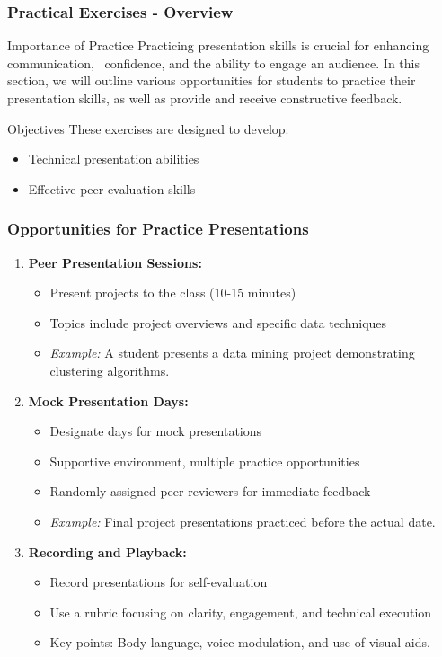 \documentclass[aspectratio=169]{beamer}
\begin{document}
\begin{frame}[fragile]
    \frametitle{Practical Exercises - Overview}
    \begin{block}{Importance of Practice}
        Practicing presentation skills is crucial for enhancing communication, \
        confidence, and the ability to engage an audience. In this section, we will outline various opportunities for students to practice their presentation skills, as well as provide and receive constructive feedback.
    \end{block}
    \begin{block}{Objectives}
        These exercises are designed to develop:
        \begin{itemize}
            \item Technical presentation abilities
            \item Effective peer evaluation skills
        \end{itemize}
    \end{block}
\end{frame}

\begin{frame}[fragile]
    \frametitle{Opportunities for Practice Presentations}
    \begin{enumerate}
        \item \textbf{Peer Presentation Sessions:}
            \begin{itemize}
                \item Present projects to the class (10-15 minutes)
                \item Topics include project overviews and specific data techniques
                \item \textit{Example:} A student presents a data mining project demonstrating clustering algorithms.
            \end{itemize}
        \item \textbf{Mock Presentation Days:}
            \begin{itemize}
                \item Designate days for mock presentations
                \item Supportive environment, multiple practice opportunities
                \item Randomly assigned peer reviewers for immediate feedback
                \item \textit{Example:} Final project presentations practiced before the actual date.
            \end{itemize}
        \item \textbf{Recording and Playback:}
            \begin{itemize}
                \item Record presentations for self-evaluation
                \item Use a rubric focusing on clarity, engagement, and technical execution
                \item Key points: Body language, voice modulation, and use of visual aids.
            \end{itemize}
    \end{enumerate}
\end{frame}
\end{document}
